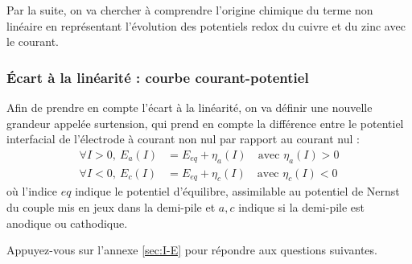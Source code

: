 \documentclass[twoside,a4paper,11pt,addpoints]{exam}%
\begin{document}
Par la suite, on va chercher à comprendre l'origine chimique du terme non linéaire en représentant l'évolution des potentiels redox du cuivre et du zinc avec le courant.

\newpage

\subsubsection{\'{E}cart à la linéarité : courbe courant-potentiel}

Afin de prendre en compte l'écart à la linéarité, on va définir une nouvelle grandeur appelée surtension, qui prend en compte la différence entre le potentiel interfacial de l'électrode à courant non nul par rapport au courant nul : 
\begin{align*}
\forall I > 0, ~ E_a (I) &= E_{eq} + \eta_a (I) \quad \text{avec }\eta_a (I) > 0 \\
\forall I < 0, ~ E_c (I) &= E_{eq} + \eta_c (I) \quad \text{avec }\eta_c (I) < 0
\end{align*}
où l'indice $eq$ indique le potentiel d'équilibre, assimilable au potentiel de Nernst du couple mis en jeux dans la demi-pile et $a,c$ indique si la demi-pile est anodique ou cathodique.

Appuyez-vous sur l'annexe \ref{sec:I-E} pour répondre aux questions suivantes.
\end{document}
